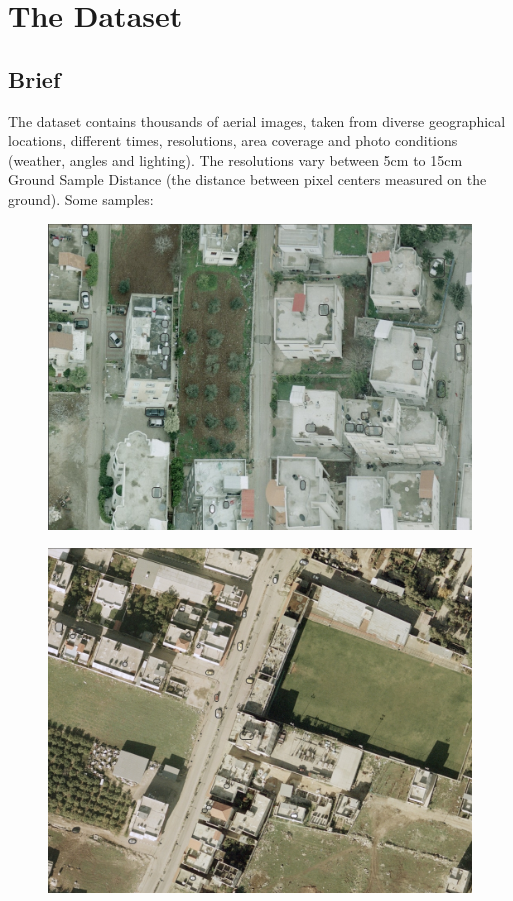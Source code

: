 \documentclass[]{article}
\begin{document}
\section{The Dataset}
\subsection{Brief}
The dataset contains thousands of aerial images, taken from diverse geographical locations, different times, resolutions, area coverage and photo conditions (weather, angles and lighting). The resolutions vary between 5cm to 15cm Ground Sample Distance (the distance between pixel centers measured on the ground). Some samples:\\
\begin{figure}[!h]
\centering
\includegraphics[width=1\linewidth]{"images/im1"}
\end{figure}
\begin{figure}[!h]
\centering
\includegraphics[width=1\linewidth]{"images/im2"}
\end{figure}
\end{document}
